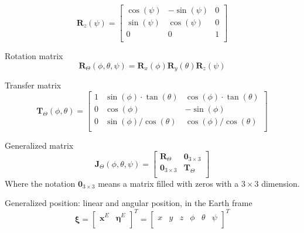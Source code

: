 \documentclass[journal]{IEEEtran}
\begin{document}
	\begin{equation} \label{eq:rotz}
	\bm{R}_z (\psi)=
	\left[ {\begin{array}{ccc}
		\cos(\psi) & -\sin(\psi) & 0 \\
		\sin(\psi) & \cos(\psi) & 0 \\
		0 &  0 & 1 \\ 
		\end{array} } \right]
	 \end{equation}  
	 
	Rotation matrix
	\begin{equation} \label{eq:rot}
		\bm{R}_\Theta (\phi, \theta, \psi) = 	\bm{R}_x (\phi)  \bm{R}_y (\theta)  \bm{R}_z (\psi)
	\end{equation}  
	
	Transfer matrix
	\begin{equation} \label{eq:transf}
		\bm{T}_\Theta (\phi,\theta )= \left[ {\begin{array}{ccc}
		1 & \sin(\phi) \cdot \tan(\theta) & \cos(\phi) \cdot \tan (\theta) \\
		0 & \cos(\phi) & -\sin(\phi) \\
		0 &  \sin(\phi)/\cos(\theta) & \cos(\phi)/\cos(\theta)  \\ 
		\end{array} } \right]
	\end{equation}  
	
	Generalized matrix
	\begin{equation} \label{eq:gen}
		\bm{J}_\Theta (\phi,\theta, \psi)= \left[ {\begin{array}{cc}
			\bm{R}_\Theta &  \mathbf{0}_{3\times 3} \\
			\mathbf{0}_{3\times 3} & \bm{T}_\Theta \\
			\end{array} } \right]
	\end{equation}  
	Where the notation $\mathbf{0}_{3\times 3}$ means a matrix filled with zeros with a $3 \times 3$ dimension.
	
	Generalized position: linear and angular position, in the Earth frame
	\begin{equation} \label{eq:pos}
		\bm{\xi} = \left[ \begin{array}{cc}
		\bm{x}^E & \bm{\eta}^E \\
		\end{array}\right]^T = \left[ \begin{array}{cccccc}
			x & y & z & \phi & \theta & \psi\\
		\end{array}\right] ^T
	\end{equation}  
	
\end{document}
